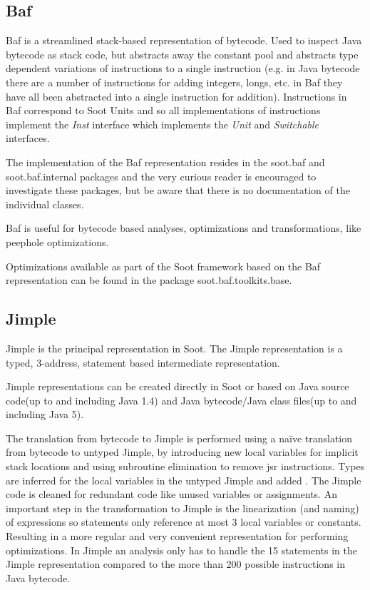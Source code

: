 \documentclass{article}
\begin{document}

\subsection{Baf}
Baf is a streamlined stack-based representation of bytecode. Used to
inspect Java bytecode as stack code, but abstracts away the constant
pool and abstracts type dependent variations of instructions to a
single instruction (e.g. in Java bytecode there are a number of
instructions for adding integers, longs, etc. in Baf they have all
been abstracted into a single instruction for addition). Instructions
in Baf correspond to Soot Units and so all implementations of
instructions implement the \textit{Inst} interface which implements
the \textit{Unit} and \textit{Switchable} interfaces.

The implementation of the Baf representation resides in the soot.baf and
soot.baf.internal packages and the very curious reader is encouraged to
investigate these packages, but be aware that there is no documentation of
the individual classes.

Baf is useful for bytecode based analyses, optimizations and
transformations, like peephole optimizations.

Optimizations available as part of the Soot framework based on the Baf
representation can be found in the package soot.baf.toolkits.base.


\subsection{Jimple}
Jimple is the principal representation in Soot. The Jimple
representation is a typed, 3-address, statement based intermediate
representation.

Jimple representations can be created directly in Soot or based on
Java source code(up to and including Java 1.4) and Java bytecode/Java
class files(up to and including Java 5).

The translation from bytecode to Jimple is performed using a na\"ive
translation from bytecode to untyped Jimple, by introducing new local
variables for implicit stack locations and using subroutine
elimination to remove jsr instructions. Types are inferred for the
local variables in the untyped Jimple and added
\cite{gagnon99intraprocedural}. The Jimple code is cleaned for
redundant code like unused variables or assignments. An important step
in the transformation to Jimple is the linearization (and naming) of
expressions so statements only reference at most 3 local variables or
constants. Resulting in a more regular and very convenient
representation for performing optimizations. In Jimple an analysis
only has to handle the 15 statements in the Jimple representation
compared to the more than 200 possible instructions in Java
bytecode.\\
\end{document}
